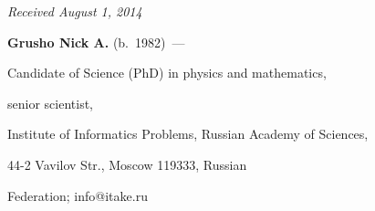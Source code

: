 




\hfill{\small\textit{Received August 1, 2014}}










\Contrl





\noindent


\textbf{Grusho Nick A.} (b.\ 1982)~---


 Candidate of Science (PhD) in physics and mathematics,


 senior scientist,


Institute of Informatics Problems, Russian Academy of Sciences,


44-2 Vavilov Str., Moscow 119333, Russian


Federation;  info@itake.ru





\label{end\stat}





\renewcommand{\bibname}{\protect\rm Литература}